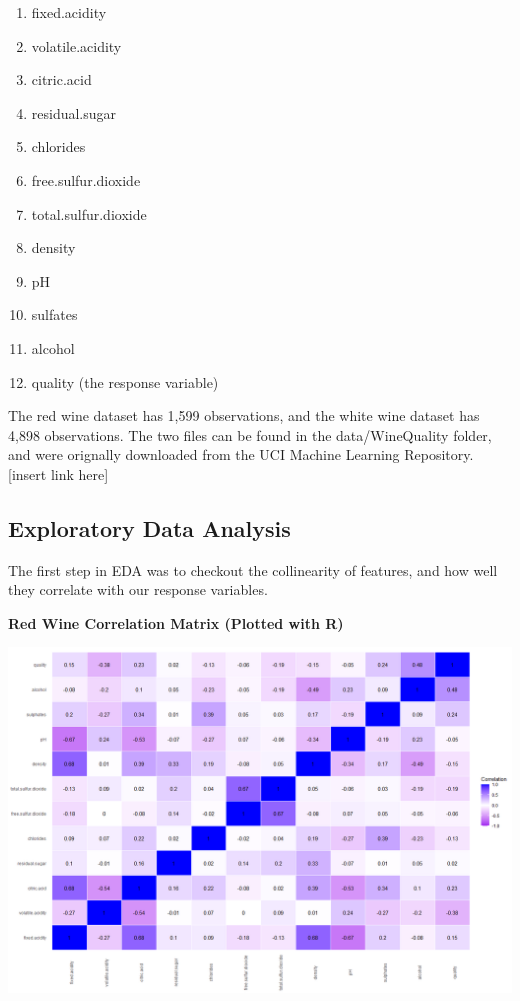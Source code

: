 \documentclass{article}
\begin{document}
	\begin{enumerate}
		\item fixed.acidity 
		\item volatile.acidity 
		\item citric.acid 
		\item residual.sugar 
		\item chlorides 
		\item free.sulfur.dioxide 
		\item total.sulfur.dioxide 
		\item density
		\item pH
		\item sulfates 
		\item alcohol 
		\item quality (the response variable)
	\end{enumerate}

	The red wine dataset has 1,599 observations, and the white wine dataset has 4,898 observations. 
	The two files can be found in the data/WineQuality folder, and were orignally downloaded from 
	the UCI Machine Learning Repository. [insert link here]

	\subsection{Exploratory Data Analysis}
	
	The first step in EDA was to checkout the collinearity of features, and how well they correlate 
	with our response variables. 
	
	
	\textbf{ Red Wine Correlation Matrix (Plotted with R)}
	
	\includegraphics[scale=0.5]{../plots/Wine/red_wine_Rcormat.png}
\end{document}
